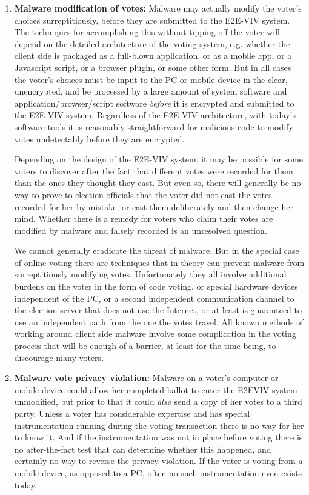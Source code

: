 \begin{enumerate}[label={\roman*})]
\item \textbf{Malware modification of votes:} Malware may actually
  modify the voter’s choices surreptitiously, before they are
  submitted to the E2E-VIV system. The techniques for accomplishing
  this without tipping off the voter will depend on the detailed
  architecture of the voting system, e.g. whether the client side is
  packaged as a full-blown application, or as a mobile app, or a
  Javascript script, or a browser plugin, or some other form. But in
  all cases the voter’s choices must be input to the PC or mobile
  device in the clear, unencrypted, and be processed by a large amount
  of system software and application/browser/script software
  \emph{before} it is encrypted and submitted to the E2E-VIV
  system. Regardless of the E2E-VIV architecture, with today’s
  software tools it is reasonably straightforward for malicious code
  to modify votes undetectably before they are encrypted.

  Depending on the design of the E2E-VIV system, it may be possible
  for some voters to discover after the fact that different votes were
  recorded for them than the ones they thought they cast. But even so,
  there will generally be no way to prove to election officials that
  the voter did not cast the votes recorded for her by mistake, or
  cast them deliberately and then change her mind. Whether there is a
  remedy for voters who claim their votes are modified by malware and
  falsely recorded is an unresolved question.

  We cannot generally eradicate the threat of malware. But in the
  special case of online voting there are techniques that in theory
  can prevent malware from surreptitiously modifying
  votes. Unfortunately they all involve additional burdens on the
  voter in the form of code voting, or special hardware devices
  independent of the PC, or a second independent communication channel
  to the election server that does not use the Internet, or at least
  is guaranteed to use an independent path from the one the votes
  travel. All known methods of working around client side malware
  involve some complication in the voting process that will be enough
  of a barrier, at least for the time being, to discourage many
  voters.

\item \textbf{Malware vote privacy violation:} Malware on a voter’s
  computer or mobile device could allow her completed ballot to enter
  the E2EVIV system unmodified, but prior to that it could \emph{also}
  send a copy of her votes to a third party. Unless a voter has
  considerable expertise and has special instrumentation running
  during the voting transaction there is no way for her to know
  it. And if the instrumentation was not in place before voting there
  is no after-the-fact test that can determine whether this happened,
  and certainly no way to reverse the privacy violation. If the voter
  is voting from a mobile device, as opposed to a PC, often no such
  instrumentation even exists today.


\end{enumerate}
